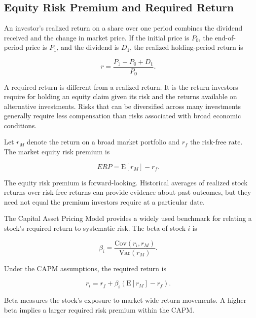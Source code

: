 \subsection{Equity Risk Premium and Required Return}

An investor's realized return on a share over one period combines the dividend received and the change in market price. If the initial price is \(P_0\), the end-of-period price is \(P_1\), and the dividend is \(D_1\), the realized holding-period return is

\begin{equation}
r
=
\frac{P_1-P_0+D_1}{P_0}.
\label{eq:ch9-equity-realized-return}
\end{equation}

A required return is different from a realized return. It is the return investors require for holding an equity claim given its risk and the returns available on alternative investments. Risks that can be diversified across many investments generally require less compensation than risks associated with broad economic conditions.

Let \(r_M\) denote the return on a broad market portfolio and \(r_f\) the risk-free rate. The market equity risk premium is

\begin{equation}
ERP
=
\mathrm{E}[r_M]-r_f.
\label{eq:ch9-equity-risk-premium}
\end{equation}

The equity risk premium is forward-looking. Historical averages of realized stock returns over risk-free returns can provide evidence about past outcomes, but they need not equal the premium investors require at a particular date.

The Capital Asset Pricing Model provides a widely used benchmark for relating a stock's required return to systematic risk. The beta of stock \(i\) is

\begin{equation}
\beta_i
=
\frac{\mathrm{Cov}(r_i,r_M)}
{\mathrm{Var}(r_M)}.
\label{eq:ch9-beta}
\end{equation}

Under the CAPM assumptions, the required return is

\begin{equation}
r_i
=
r_f
+
\beta_i\left(\mathrm{E}[r_M]-r_f\right).
\label{eq:ch9-capm}
\end{equation}

Beta measures the stock's exposure to market-wide return movements. A higher beta implies a larger required risk premium within the CAPM.

